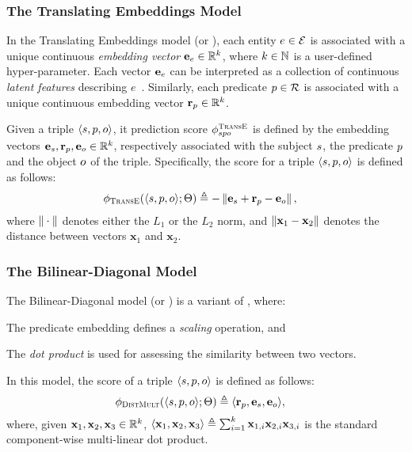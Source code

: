 %
\subsubsection{The Translating Embeddings Model}
%

%
In the Translating Embeddings model (or ), each entity $e \in \mathcal{E}$ is associated with a unique continuous \emph{embedding vector} $\mathbf{e}_{e} \in \mathbb{R}^{k}$, where $k \in \mathbb{N}$ is a user-defined hyper-parameter.
%
Each vector $\mathbf{e}_{e}$ can be interpreted as a collection of continuous \emph{latent features} describing $e$~\cite{DBLP:journals/pieee/Nickel0TG16}.
%
Similarly, each predicate $p \in \mathcal{R}$ is associated with a unique continuous embedding vector $\mathbf{r}_{p} \in \mathbb{R}^{k}$.
%

%
Given a triple $\langle s, p, o \rangle$, it prediction score $\phi_{spo}^{{\textsc{TransE}}}$ is defined by the embedding vectors $\mathbf{e}_{s}, \mathbf{r}_{p}, \mathbf{e}_{o} \in \mathbb{R}^{k}$, respectively associated with the subject $s$, the predicate $p$ and the object $o$ of the triple.
%
Specifically, the score for a triple $\langle s, p, o \rangle$ is defined as follows:
%
\begin{equation*} \label{eq:transe}
 \begin{aligned}
  \phi_{{\textsc{TransE}}}(\langle s, p, o \rangle ; \Theta) & \triangleq - \left\lVert\mathbf{e}_{s} + \mathbf{r}_{p} - \mathbf{e}_{o}\right\rVert,
 \end{aligned}
\end{equation*}
%
\noindent where $\left\lVert{}\cdot{}\right\rVert$ denotes either the $L_{1}$ or the $L_{2}$ norm, and $\left\lVert\mathbf{x}_{1} - \mathbf{x}_{2}\right\rVert$ 
denotes the distance between vectors $\mathbf{x}_{1}$ and $\mathbf{x}_{2}$.
%

%
\subsubsection{The Bilinear-Diagonal Model}
%

%
The Bilinear-Diagonal model (or ) is a variant of , where:
%
\begin{inparaenum}[1)]
%
 \item The predicate embedding defines a \emph{scaling} operation, and
%
 \item The \emph{dot product} is used for assessing the similarity between two vectors.
%
\end{inparaenum}
%
In this model, the score of a triple $\langle s, p, o \rangle$ is defined as follows:
%
\begin{equation*} \label{eq:distmult}
\begin{aligned}
\phi_{{\textsc{DistMult}}}(\langle s, p, o \rangle ; \Theta) & \triangleq \langle \mathbf{r}_{p}, \mathbf{e}_{s}, \mathbf{e}_{o} \rangle,
\end{aligned}
\end{equation*}
%
\noindent where, given $\mathbf{x}_{1}, \mathbf{x}_{2}, \mathbf{x}_{3} \in \mathbb{R}^{k}$, $\langle \mathbf{x}_{1}, \mathbf{x}_{2}, \mathbf{x}_{3} \rangle \triangleq \sum_{i=1}^{k} \mathbf{x}_{1, i} \mathbf{x}_{2, i} \mathbf{x}_{3, i}$ is the standard component-wise multi-linear dot product.
%


